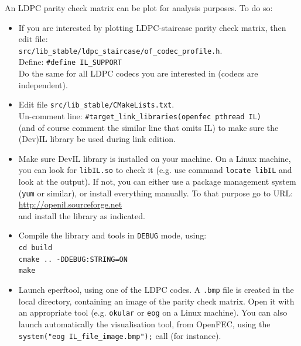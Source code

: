 \documentclass[a4paper,11pt]{article}
\begin{document}
{An LDPC parity check matrix can be plot for analysis purposes.
To do so:

\begin{itemize}
\item If you are interested by plotting LDPC-staircase parity check matrix,
	then edit file:\\
	\verb+src/lib_stable/ldpc_staircase/of_codec_profile.h+.\\
	Define: \verb+#define IL_SUPPORT+\\
	Do the same for all LDPC codecs you are interested in (codecs are independent).

\item Edit file \verb+src/lib_stable/CMakeLists.txt+.\\
	Un-comment line: \verb+#target_link_libraries(openfec pthread IL)+ \\
	(and of course comment the similar line that omits IL) to make sure the
	(Dev)IL library be used during link edition.
\item Make sure DevIL library is installed on your machine. On a Linux machine,
	you can look for \verb+libIL.so+ to check it (e.g. use command
	\verb+locate libIL+ and look at the output).
	If not, you can either use a package management system (\verb+yum+ or similar),
	or install everything manually. To that purpose go to URL: \\
	\href{http://openil.sourceforge.net}{http://openil.sourceforge.net}\\
	and install the library as indicated.
\item Compile the library and tools in \verb+DEBUG+ mode, using: \\
\verb+cd build+ \\
\verb+cmake .. -DDEBUG:STRING=ON+\\
\verb+make+ \\
\item Launch eperftool, using one of the LDPC codes. A \verb+.bmp+ file is
	created in the local directory, containing an image of the parity
	check matrix. Open it with an appropriate tool (e.g. \verb+okular+ or \verb+eog+
	on a Linux machine).
	You can also launch automatically the visualisation tool, from OpenFEC,
	using the \verb+system("eog IL_file_image.bmp");+ call (for instance).
\end{itemize}

}
\end{document}
